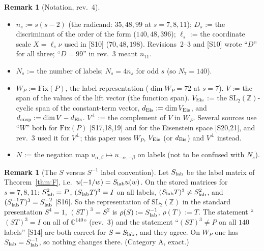\documentclass[11pt]{article}
\theoremstyle{definition}
\newtheorem{remark}[theorem]{Remark}
\theoremstyle{plain}
\newcommand{\Z}{\mathbb{Z}}
\newcommand{\C}{\mathbb{C}}
\newcommand{\src}[1]{\textup{[S#1]}}
\begin{document}
\begin{remark}[Notation, rev.~4]\label{rem:notation}
\begin{itemize}[leftmargin=2em]
\item $n_s:=s(s-2)$ (the radicand: $35,48,99$ at $s=7,8,11$); $D_s$ := the discriminant of the order of the form ($140,48,396$); $\ell_s$ := the coordinate
scale $X=\ell_s\nu$ used in \src{10} ($70,48,198$). Revisions~2--3 and \src{10} wrote ``$D$'' for all three; ``$D=99$'' in rev.~3 meant $n_{11}$.
\item $N_s$ := the number of labels; $N_s=4n_s$ for odd $s$ (so $N_7=140$).
\item $W_P:=\mathrm{Fix}(P)$, the label representation ($\dim W_P=72$ at $s=7$). $V$ := the span of the values of the lift vector (the function span).
$V_{\rm Eis}$ := the $\mathrm{SL}_2(\Z)$-cyclic span of the constant-term vector, $d_{\rm Eis}:=\dim V_{\rm Eis}$, and $d_{\rm cusp}:=\dim V-d_{\rm Eis}$.
$V^\perp$ := the complement of $V$ in $W_P$. Several sources use ``$W$'' both for $\mathrm{Fix}(P)$ \src{17,18,19} and for the Eisenstein space \src{20,21},
and rev.~3 used it for $V^\perp$; this paper uses $W_P$, $V_{\rm Eis}$ (or $d_{\rm Eis}$) and $V^\perp$ instead.
\item $N$ := the negation map $u_{\alpha,\beta}\mapsto u_{-\alpha,-\beta}$ on labels (not to be confused with $N_s$).
\end{itemize}
\end{remark}

\begin{remark}[The $S$ versus $S^{-1}$ label convention]\label{rem:Sconv}
Let $S_{\rm lab}$ be the label matrix of Theorem~\ref{thm:F}, i.e.\ $u(-1/w)=S_{\rm lab}u(w)$. On the stored matrices for $s=7,8,11$:
$S_{\rm lab}^2=P$, $(S_{\rm lab}T)^3=I$ on all labels, $(S_{\rm lab}T)^3\neq S_{\rm lab}^2$, and $(S_{\rm lab}^{-1}T)^3=S_{\rm lab}^{-2}$ \src{16}. So the representation of
$\mathrm{SL}_2(\Z)$ in the standard presentation $S^4=1$, $(ST)^3=S^2$ is $\rho(S):=S_{\rm lab}^{-1}$, $\rho(T):=T$. The statement ``$(ST)^3=I$ on all of $\C^{140}$''
(rev.~3) and the statement ``$(ST)^3\neq P$ on all $140$ labels'' \src{14} are both correct for $S=S_{\rm lab}$, and they agree. On $W_P$ one has $S_{\rm lab}=S_{\rm lab}^{-1}$,
so nothing changes there. (Category A, exact.)
\end{remark}
\end{document}
